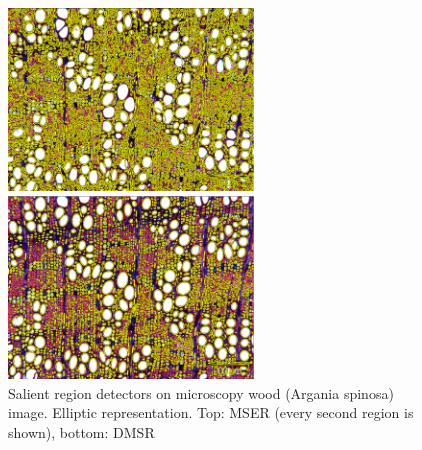 \documentclass[conference,compsoc]{IEEEtran}
\begin{document}
 
\begin{figure}[htb]
\begin{minipage}[b]{.99\linewidth}
  \centering
  \centerline{\includegraphics[width=6.5cm]{mserWood}}
\end{minipage}
\hfill
\vspace{0.2cm}
\begin{minipage}[b]{0.99\linewidth}
  \centering
  \centerline{\includegraphics[width=6.5cm]{dmsrWood}}
\end{minipage}
\vspace{-0.1cm}
\caption{Salient region detectors on microscopy wood (Argania spinosa) image. Elliptic representation. Top: MSER (every second region is shown), bottom: DMSR}
\label{fig:wood}
\end{figure}
\end{document}
